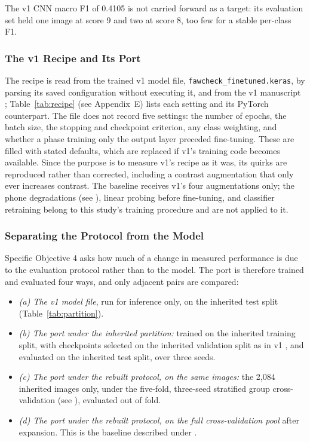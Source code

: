 \documentclass{icsthesis}
\newcommand{\secref}[1]{\textit{\nameref{#1}}}
\begin{document}
\begin{mainmatter}
					The v1 CNN macro F1 of 0.4105 is not carried forward as a target:
					its evaluation set held one image at score 9 and two at score 8, too
					few for a stable per-class F1.

				\subsubsection{The v1 Recipe and Its Port}\label{sec:recipe}

					The recipe is read from the trained v1 model file,
					\texttt{fawcheck\_finetuned.keras}, by parsing its saved
					configuration without executing it, and from the v1 manuscript
					\citep{casasola2026}; Table~\ref{tab:recipe} (see
					Appendix~E) lists each setting and its PyTorch counterpart.
					The file does not record five settings: the number of epochs, the
					batch size, the stopping and checkpoint criterion, any class
					weighting, and whether a phase training only the output layer
					preceded fine-tuning. These are filled with stated defaults, which
					are replaced if v1's training code becomes available. Since the purpose is to measure
					v1's recipe as it was, its quirks are reproduced rather than
					corrected, including a contrast augmentation that only ever
					increases contrast. The baseline receives v1's four augmentations
					only; the phone degradations (see \secref{sec:augment}), linear
					probing before fine-tuning, and classifier retraining belong to this
					study's training procedure and are not applied to it.

				\subsubsection{Separating the Protocol from the Model}\label{sec:armdesign}

					Specific Objective 4 asks how much of a change in measured performance is due to
					the evaluation protocol rather than to the model. The port is therefore trained
					and evaluated four ways, and only adjacent pairs are compared:

					\begin{itemize}
						\item \textit{(a) The v1 model file}, run for inference only, on the
							inherited test split (Table~\ref{tab:partition}).
						\item \textit{(b) The port under the inherited partition:} trained on the
							inherited training split, with checkpoints selected on the inherited
							validation split as in v1 \citep{casasola2026}, and evaluated on the
							inherited test split, over three seeds.
						\item \textit{(c) The port under the rebuilt protocol, on the same images:}
							the 2,084 inherited images only, under the five-fold, three-seed
							stratified group cross-validation (see \secref{sec:cv}), evaluated out
							of fold.
						\item \textit{(d) The port under the rebuilt protocol, on the full
							cross-validation pool} after expansion. This is the baseline described
							under \secref{sec:baseline}.
					\end{itemize}


\end{mainmatter}
\end{document}
